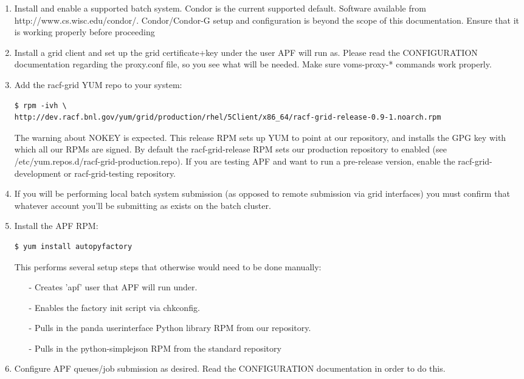 \documentclass[a4paper]{jpconf}
\begin{document}
\begin{enumerate}
\item Install and enable a supported batch system. 
Condor is the current supported default. 
Software available from http://www.cs.wisc.edu/condor/.
Condor/Condor-G setup and configuration is beyond the scope of this documentation. Ensure that it is working properly before proceeding
\item Install a grid client and set up the grid certificate+key under the user APF will run as. 
Please read the CONFIGURATION documentation regarding the proxy.conf file, so you see what will be needed. 
Make sure voms-proxy-* commands work properly.
\item Add the racf-grid YUM repo to your system:
\begin{verbatim}
$ rpm -ivh \
http://dev.racf.bnl.gov/yum/grid/production/rhel/5Client/x86_64/racf-grid-release-0.9-1.noarch.rpm
\end{verbatim}
The warning about NOKEY is expected. 
This release RPM sets up YUM to point at our repository, 
and installs the GPG key with which all our RPMs are signed. 
By default the racf-grid-release RPM sets our production repository to enabled 
(see /etc/yum.repos.d/racf-grid-production.repo). 
If you are testing APF and want to run a pre-release version, enable the racf-grid-development or racf-grid-testing repository.
\item If you will be performing local batch system submission 
(as opposed to remote submission via grid interfaces) 
you must confirm that whatever account you'll be submitting as exists on the batch cluster.
\item Install the APF RPM:
\begin{verbatim}
$ yum install autopyfactory
\end{verbatim}
This performs several setup steps that otherwise would need to be done manually:
\begin{enumerate}
\item[-] Creates 'apf' user that APF will run under. 
\item[-] Enables the factory init script via chkconfig. 
\item[-] Pulls in the panda userinterface Python library RPM from our repository. 
\item[-] Pulls in the python-simplejson RPM from the standard repository
\end{enumerate}
\item Configure APF queues/job submission as desired. 
Read the CONFIGURATION documentation in order to do this. 

\end{enumerate}
\end{document}
